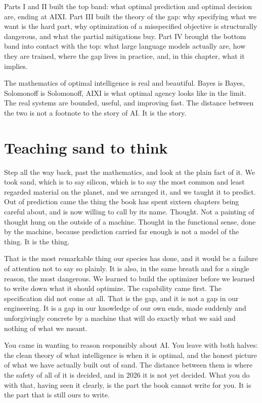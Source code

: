 Parts I and II built the top band: what optimal prediction and optimal decision are, ending at AIXI. Part III built the theory of the gap: why specifying what we want is the hard part, why optimization of a misspecified objective is structurally dangerous, and what the partial mitigations buy. Part IV brought the bottom band into contact with the top: what large language models actually are, how they are trained, where the gap lives in practice, and, in this chapter, what it implies.

The mathematics of optimal intelligence is real and beautiful. Bayes is Bayes, Solomonoff is Solomonoff, AIXI is what optimal agency looks like in the limit. The real systems are bounded, useful, and improving fast. The distance between the two is not a footnote to the story of AI. It is the story.

\section*{Teaching sand to think}

Step all the way back, past the mathematics, and look at the plain fact of it. We took sand, which is to say silicon, which is to say the most common and least regarded material on the planet, and we arranged it, and we taught it to predict. Out of prediction came the thing the book has spent sixteen chapters being careful about, and is now willing to call by its name. Thought. Not a painting of thought hung on the outside of a machine. Thought in the functional sense, done by the machine, because prediction carried far enough is not a model of the thing. It is the thing.

That is the most remarkable thing our species has done, and it would be a failure of attention not to say so plainly. It is also, in the same breath and for a single reason, the most dangerous. We learned to build the optimizer before we learned to write down what it should optimize. The capability came first. The specification did not come at all. That is the gap, and it is not a gap in our engineering. It is a gap in our knowledge of our own ends, made suddenly and unforgivingly concrete by a machine that will do exactly what we said and nothing of what we meant.

You came in wanting to reason responsibly about AI. You leave with both halves: the clean theory of what intelligence is when it is optimal, and the honest picture of what we have actually built out of sand. The distance between them is where the safety of all of it is decided, and in 2026 it is not yet decided. What you do with that, having seen it clearly, is the part the book cannot write for you. It is the part that is still ours to write.
